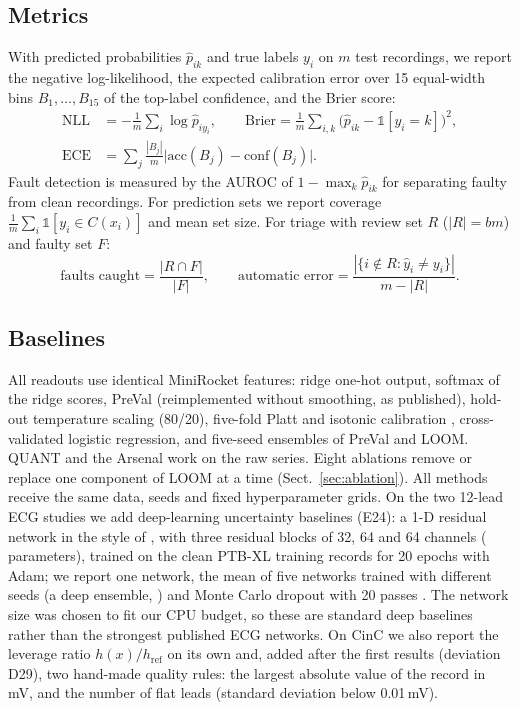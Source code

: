 \documentclass[preprint,12pt,authoryear]{elsarticle}
\begin{document}
\subsection{Metrics}
With predicted probabilities $\hat p_{ik}$ and true labels $y_i$ on $m$ test recordings, we report the negative log-likelihood, the expected calibration error over 15 equal-width bins $B_1,\dots,B_{15}$ of the top-label confidence, and the Brier score:
\begin{align}
\mathrm{NLL}&=-\frac1m\sum_{i}\log\hat p_{iy_i},\qquad
\mathrm{Brier}=\frac1m\sum_{i,k}\big(\hat p_{ik}-\mathbb 1[y_i=k]\big)^2,\\
\mathrm{ECE}&=\sum_{j}\frac{|B_j|}{m}\big|\mathrm{acc}(B_j)-\mathrm{conf}(B_j)\big| .
\end{align}
Fault detection is measured by the AUROC of $1-\max_k\hat p_{ik}$ for separating faulty from clean recordings. For prediction sets we report coverage $\frac1m\sum_i\mathbb 1[y_i\in C(x_i)]$ and mean set size. For triage with review set $R$ ($|R|=bm$) and faulty set $F$:
\begin{equation}
\text{faults caught}=\frac{|R\cap F|}{|F|},\qquad
\text{automatic error}=\frac{|\{i\notin R:\hat y_i\neq y_i\}|}{m-|R|}.
\end{equation}

\subsection{Baselines}
All readouts use identical MiniRocket features: ridge one-hot output, softmax of the ridge scores, PreVal \citep{dempster2025preval} (reimplemented without smoothing, as published), hold-out temperature scaling (80/20), five-fold Platt and isotonic calibration \citep{pedregosa2011}, cross-validated logistic regression, and five-seed ensembles of PreVal and LOOM. QUANT \citep{dempster2024quant} and the Arsenal \citep{middlehurst2021hc2} work on the raw series. Eight ablations remove or replace one component of LOOM at a time (Sect.~\ref{sec:ablation}). All methods receive the same data, seeds and fixed hyperparameter grids. On the two 12-lead ECG studies we add deep-learning uncertainty baselines (E24): a 1-D residual network in the style of \citet{wang2017baseline}, with three residual blocks of 32, 64 and 64 channels (\DeepParams{} parameters), trained on the clean PTB-XL training records for 20 epochs with Adam; we report one network, the mean of five networks trained with different seeds (a deep ensemble, \citealp{lakshminarayanan2017}) and Monte Carlo dropout with 20 passes \citep{gal2016dropout}. The network size was chosen to fit our CPU budget, so these are standard deep baselines rather than the strongest published ECG networks. On CinC we also report the leverage ratio $h(x)/h_{\mathrm{ref}}$ on its own and, added after the first results (deviation D29), two hand-made quality rules: the largest absolute value of the record in mV, and the number of flat leads (standard deviation below 0.01\,mV).
\end{document}
